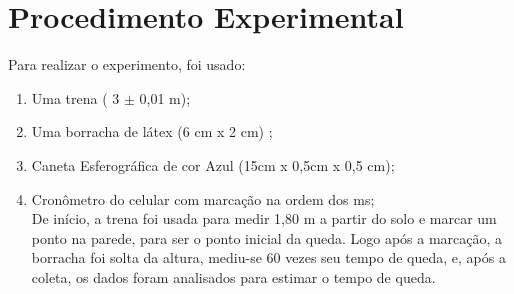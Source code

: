 \documentclass[11pt, letterpaper]{article}
\begin{document}
\section{Procedimento Experimental}
Para realizar o experimento, foi usado:
\begin{enumerate}
\item Uma trena ( 3 $\pm$ 0,01 m);
\item Uma borracha de látex (6 cm x 2 cm) ;  
\item Caneta Esferográfica de cor Azul (15cm x 0,5cm x 0,5 cm);
\item Cronômetro do celular com marcação na ordem dos ms; \\

De início, a trena foi usada para medir 1,80 m a partir do solo e marcar um ponto na parede, para ser o ponto inicial da queda. Logo após a marcação, a borracha foi solta da altura, mediu-se 60 vezes seu tempo de queda, e, após a coleta, os dados foram analisados para estimar o tempo de queda.
\newpage

\end{enumerate}
\end{document}
